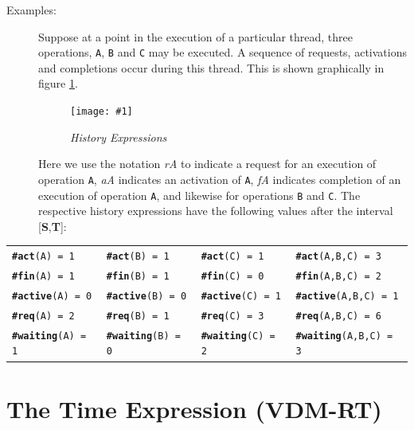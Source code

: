\documentclass{overturerepchap}
\newcommand{\insertfig}[4]{ %
\begin{figure}[htb]
\begin{center}
\texttt{[image: \#1]} 
\end{center}
\caption{{\em #3}} #4
\end{figure}
}
\begin{document}
\begin{description}
\item[Examples:]Suppose at a point in the execution of a particular
thread, three operations, \texttt{A}, \texttt{B} and \texttt{C} may be
executed. A sequence of requests, activations and completions occur
during this thread. This is shown graphically in figure \ref{historyfig}.

\insertfig{history}{14cm}{History Expressions}{\label{historyfig}}

Here we use the notation \textit{rA} to indicate a request for an
execution of operation \texttt{A}, \textit{aA} indicates an activation
of \texttt{A}, \textit{fA} indicates completion of an execution of
operation \texttt{A}, and likewise for operations \texttt{B} and
\texttt{C}. The respective history expressions have the following
values after the interval [\textbf{S},\textbf{T}]:
\end{description}

\begin{center}\small
\begin{tabular}{llll}
\texttt{{\bf\ttfamily \#act}(A) = 1} & \texttt{{\bf\ttfamily \#act}(B) = 1} & \texttt{{\bf\ttfamily \#act}(C) = 1}
& \texttt{{\bf\ttfamily \#act}(A,B,C) = 3}\\
\texttt{{\bf\ttfamily \#fin}(A) = 1} & \texttt{{\bf\ttfamily \#fin}(B) = 1} & \texttt{{\bf\ttfamily \#fin}(C) = 0}
& \texttt{{\bf\ttfamily \#fin}(A,B,C) = 2}\\
\texttt{{\bf\ttfamily \#active}(A) = 0} & \texttt{{\bf\ttfamily \#active}(B) = 0} & 
\texttt{{\bf\ttfamily \#active}(C) = 1} & \texttt{{\bf\ttfamily \#active}(A,B,C) = 1}\\
\texttt{{\bf\ttfamily \#req}(A) = 2} & \texttt{{\bf\ttfamily \#req}(B) = 1} & \texttt{{\bf\ttfamily \#req}(C) = 3}
& \texttt{{\bf\ttfamily \#req}(A,B,C) = 6}\\
\texttt{{\bf\ttfamily \#waiting}(A) = 1} & \texttt{{\bf\ttfamily \#waiting}(B) = 0} & 
\texttt{{\bf\ttfamily \#waiting}(C) = 2} & \texttt{{\bf\ttfamily \#waiting}(A,B,C) = 3}\\
\end{tabular}
\end{center}


\section{The Time Expression (VDM-RT)}\label{sec:time}
\end{document}
